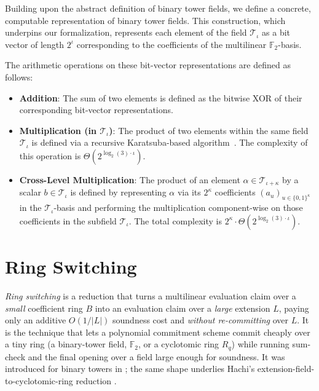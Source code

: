 \begin{definition}
  \label{def:computable_binary_tower_field}
  Building upon the abstract definition of binary tower fields, we define a concrete, computable representation of binary tower fields. This construction, which underpins our formalization, represents each element of the field $\mathcal{T}_\iota$ as a bit vector of length $2^\iota$ corresponding to the coefficients of the multilinear $\mathbb{F}_2$-basis.

  The arithmetic operations on these bit-vector representations are defined as follows:
  \begin{itemize}
      \item \textbf{Addition}: The sum of two elements is defined as the bitwise XOR of their corresponding bit-vector representations.

      \item \textbf{Multiplication (in $\mathcal{T}_\iota$)}: The product of two elements within the same field $\mathcal{T}_\iota$ is defined via a recursive Karatsuba-based algorithm~\cite{FP97}. The complexity of this operation is $\Theta(2^{\log_2(3) \cdot \iota})$.

      \item \textbf{Cross-Level Multiplication}: The product of an element $\alpha \in \mathcal{T}_{\iota+\kappa}$ by a scalar $b \in \mathcal{T}_\iota$ is defined by representing $\alpha$ via its $2^\kappa$ coefficients $(a_u)_{u \in \{0,1\}^\kappa}$ in the $\mathcal{T}_\iota$-basis and performing the multiplication component-wise on those coefficients in the subfield $\mathcal{T}_\iota$. The total complexity is $2^\kappa \cdot \Theta(2^{\log_2(3) \cdot \iota})$.
  \end{itemize}
\end{definition}


\section{Ring Switching}\label{sec:ring_switching}

\emph{Ring switching} is a reduction that turns a multilinear evaluation claim over a \emph{small}
coefficient ring $B$ into an evaluation claim over a \emph{large} extension $L$, paying only an
additive $O(1/\lvert L\rvert)$ soundness cost and \emph{without re-committing} over $L$. It is the
technique that lets a polynomial commitment scheme commit cheaply over a tiny ring (a binary-tower
field, $\mathbb{F}_2$, or a cyclotomic ring $R_q$) while running sum-check and the final opening over
a field large enough for soundness. It was introduced for binary towers in \cite{DP24}; the same
shape underlies Hachi's extension-field-to-cyclotomic-ring reduction \cite{NOZ26}.

